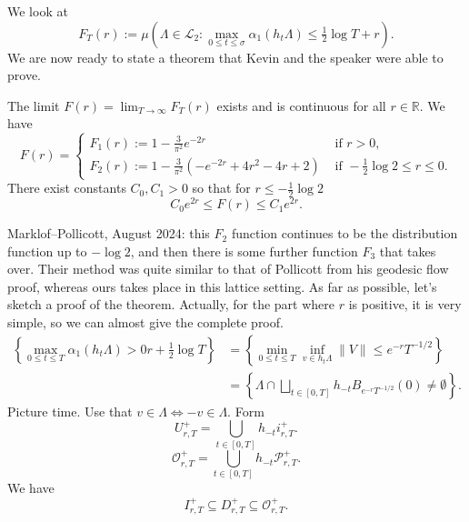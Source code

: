 \documentclass[reqno]{amsart} 
\numberwithin{theorem}{section}
\numberwithin{equation}{section}
\begin{document}
We look at
\begin{equation*}
  F_T(r) :=
  \mu \left( \Lambda \in \mathcal{L}_2: \max_{0 \leq t \leq \sigma}
    \alpha_1(h_t \Lambda)
    \leq \tfrac{1}{2} \log T + r
  \right).
\end{equation*}
We are now ready to state a theorem that Kevin and the speaker were able to prove.
\begin{theorem}
  The limit $F(r) = \lim_{T \rightarrow \infty} F_T(r)$ exists and is continuous for all $r \in \mathbb{R}$.  We have
  \begin{equation*}
    F(r) =
    \begin{cases}
      F_1(r) := 1 - \frac{3}{ \pi^2} e^{- 2 r}      & \text{ if } r > 0, \\
      F_2(r) := 1 - \frac{3}{\pi^2} \left( - e^{- 2 r} + 4 r^2 - 4 r + 2 \right)& \text{ if } - \tfrac{1}{2} \log 2 \leq r \leq 0.
    \end{cases}
  \end{equation*}
  There exist constants $C_0, C_1 > 0$ so that for $r \leq - \tfrac{1}{2} \log 2$
  \begin{equation*}
    C_0 e^{2 r} \leq F(r) \leq C_1 e^{2 r}.
  \end{equation*}
\end{theorem}

Marklof--Pollicott, August 2024: this $F_2$ function continues to be the distribution function up to $- \log 2$, and then there is some further function $F_3$ that takes over.  Their method was quite similar to that of Pollicott from his geodesic flow proof, whereas ours takes place in this lattice setting.  As far as possible, let's sketch a proof of the theorem.  Actually, for the part where $r$ is positive, it is very simple, so we can almost give the complete proof.
\begin{align*}
  \left\{ \max_{0 \leq t \leq T} \alpha_1(h_t \Lambda) > 0 r + \tfrac{1}{2} \log T \right\}
  &=
    \left\{ \min_{0 \leq t \leq T} \inf_{v \in h_t \Lambda} \lVert V \rVert \leq e^{- r} T^{-1/2} \right\} \\
  &= \left\{ \Lambda \cap \bigsqcup_{t \in[0, T]} h_{-t} B_{e^{- r} T^{-1/2}}(0) \neq \emptyset \right\}.
\end{align*}
Picture time.  Use that $v \in \Lambda \iff - v \in \Lambda$.  Form
\begin{equation*}
  U_{r, T}^+ = \bigcup_{t \in[0, T]} h_{- t} i_{r, T}^+.
\end{equation*}
\begin{equation*}
  \mathcal{O}_{r, T}^+ = \bigcup_{t \in[0, T]} h_{- t} \mathcal{P}_{r, T}^+.
\end{equation*}
We have
\begin{equation*}
  I_{r, T}^+ \subseteq D_{r, T}^+ \subseteq \mathcal{O}_{r, T}^+.
\end{equation*}
\end{document}
